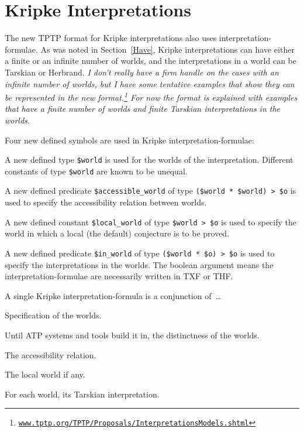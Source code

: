 \documentclass{easychair}
\newenvironment{packed_itemize}{
\vspace*{-0.3em}
\begin{itemize}
\setlength{\partopsep}{0pt}
\setlength{\itemsep}{1pt}
\setlength{\parskip}{0pt}
\setlength{\parsep}{0pt}
}{\end{itemize}}
\begin{document}
\section{Kripke Interpretations}
\label{NewKripke}
 
The new TPTP format for Kripke interpretations also uses interpretation-formulae.
As was noted in Section~\ref{Have}, Kripke interpretations can have either a finite or an
infinite number of worlds, and the interpretations in a world can be Tarskian or Herbrand.
\emph{I don't really have a firm handle on the cases with an infinite number of worlds, but I 
have some tentative examples that show they can be represented in the new format.\footnote{%
\href{https://www.tptp.org/TPTP/Proposals/InterpretationsModels.shtml\#KripkeInfiniteFinite}{{\tt www.tptp.org/TPTP/Proposals/InterpretationsModels.shtml}}}
For now the format is explained with examples that have a finite number of worlds and finite
Tarskian interpretations in the worlds.}

Four new defined symbols are used in Kripke interpretation-formulae:
\begin{packed_itemize}
\item A new defined type {\tt \$world} is used for the worlds of the interpretation.
      Different constants of type {\tt \$world} are known to be unequal. 
\item A new defined predicate {\tt \$accessible\_world} of type {\tt (\$world * \$world) > \$o}
      is used to specify the accessibility relation between worlds.
\item A new defined constant {\tt \$local\_world} of type {\tt \$world > \$o} is used to specify 
      the world in which a local (the default) conjecture is to be proved. 
\item A new defined predicate {\tt \$in\_world} of type {\tt (\$world * \$o) > \$o} is used to 
      specify the interpretations in the worlds.
      The boolean argument means the interpretation-formulae are necessarily written in TXF or THF.
\end{packed_itemize}

A single Kripke interpretation-formula is a conjunction of~\ldots
\begin{packed_itemize}
\item Specification of the worlds.
\item Until ATP systems and tools build it in, the distinctness of the worlds.
\item The accessibility relation.
\item The local world if any.
\item For each world, its Tarskian interpretation.
\end{packed_itemize}
\end{document}
